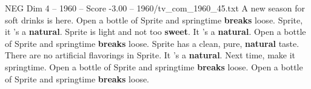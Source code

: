 \begin{textsample}{NEG Dim 4 – 1960 – Score -3.00 – 1960/tv\_com\_1960\_45.txt}  \label{ex:f4_neg_082}
A new season for soft drinks is here.
Open a bottle of Sprite and springtime \textbf{breaks} loose.
Sprite, it 's a \textbf{natural}.
Sprite is light and not too \textbf{sweet}.
It 's a \textbf{natural}.
Open a bottle of Sprite and springtime \textbf{breaks} loose.
Sprite has a clean, pure, \textbf{natural} taste.
There are no artificial flavorings in Sprite.
It 's a \textbf{natural}.
Next time, make it springtime.
Open a bottle of Sprite and springtime \textbf{breaks} loose.
Open a bottle of Sprite and springtime \textbf{breaks} loose.

\end{textsample}
